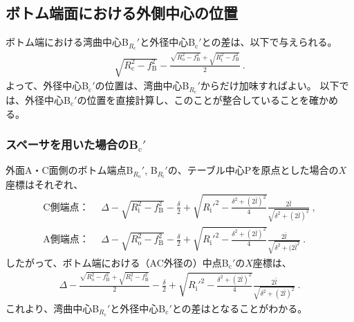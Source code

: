 \subsection{ボトム端面における外側中心の位置}
ボトム端における湾曲中心B$_{R_\mathrm c}'$と外径中心B$_\mathrm c'$との差は、以下で与えられる。
\begin{align}
  \label{eq:BRc-Bc}
  \sqrt{R_\mathrm c^2-f_\mathrm B^2}
  -\frac{\sqrt{R_\mathrm o^2-f_\mathrm B^2}+\sqrt{R_\mathrm i^2-f_\mathrm B^2}}2\ .
\end{align}
よって、外径中心B$_\mathrm c'$の位置は、湾曲中心B$_{R_\mathrm c}'$からだけ加味すればよい。
以下では、外径中心B$_\mathrm c'$の位置を直接計算し、このことが整合していることを確かめる。


\subsubsection{スペーサを用いた場合のB\texorpdfstring{$_\mathrm c'$}{c'}}
外面A・C面側のボトム端点B$_{R_\mathrm o}'$, B$_{R_\mathrm i}'$の、テーブル中心Pを原点とした場合の$X$座標はそれぞれ、
\begin{align*}
  \text{C側端点：}&~~
  \varDelta-\sqrt{R_\mathrm i^2-f_\mathrm B^2}-\frac\delta2+\sqrt{R_\mathrm i'^2-\frac{\delta^2+(2\bar l)^2}4}\frac{2\bar l}{\sqrt{\delta^2+(2\bar l)^2}}\ ,\\
  \text{A側端点：}&~~
  \varDelta-\sqrt{R_\mathrm o^2-f_\mathrm B^2}-\frac\delta2+\sqrt{R_\mathrm i'^2-\frac{\delta^2+(2\bar l)^2}4}\frac{2\bar l}{\sqrt{\delta^2+(2\bar l^2}}\ .
\end{align*}
したがって、ボトム端における（AC外径の）中点B$_\mathrm c'$の$X$座標は、
\begin{align}
  \label{eq:spacerBc}
  \varDelta-\frac{\sqrt{R_\mathrm o^2-f_\mathrm B^2}+\sqrt{R_\mathrm i^2-f_\mathrm B^2}}2
  -\frac\delta2+\sqrt{R_\mathrm i'^2-\frac{\delta^2+(2\bar l)^2}4}\frac{2\bar l}{\sqrt{\delta^2+(2\bar l)^2}}\ .
\end{align}
これより、湾曲中心B$_{R_\mathrm c}'$と外径中心B$_\mathrm c'$との差はとなることがわかる。


